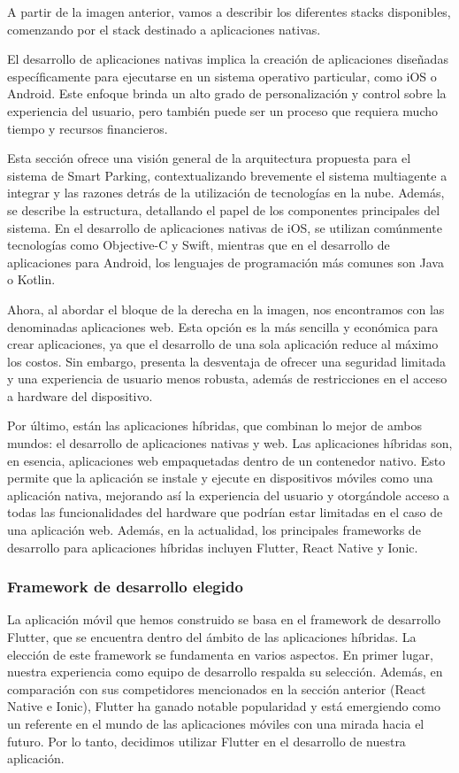 A partir de la imagen anterior, vamos a describir los diferentes stacks disponibles, comenzando por el stack destinado a aplicaciones nativas.

El desarrollo de aplicaciones nativas implica la creación de aplicaciones diseñadas específicamente para ejecutarse en un sistema operativo particular, como iOS o Android. Este enfoque brinda un alto grado de personalización y control sobre la experiencia del usuario, pero también puede ser un proceso que requiera mucho tiempo y recursos financieros.

Esta sección ofrece una visión general de la arquitectura propuesta para el sistema de Smart Parking, contextualizando brevemente el sistema multiagente a integrar y las razones detrás de la utilización de tecnologías en la nube. Además, se describe la estructura, detallando el papel de los componentes principales del sistema. En el desarrollo de aplicaciones nativas de iOS, se utilizan comúnmente tecnologías como Objective-C y Swift, mientras que en el desarrollo de aplicaciones para Android, los lenguajes de programación más comunes son Java o Kotlin.

Ahora, al abordar el bloque de la derecha en la imagen, nos encontramos con las denominadas aplicaciones web. Esta opción es la más sencilla y económica para crear aplicaciones, ya que el desarrollo de una sola aplicación reduce al máximo los costos. Sin embargo, presenta la desventaja de ofrecer una seguridad limitada y una experiencia de usuario menos robusta, además de restricciones en el acceso a hardware del dispositivo.

Por último, están las aplicaciones híbridas, que combinan lo mejor de ambos mundos: el desarrollo de aplicaciones nativas y web. Las aplicaciones híbridas son, en esencia, aplicaciones web empaquetadas dentro de un contenedor nativo. Esto permite que la aplicación se instale y ejecute en dispositivos móviles como una aplicación nativa, mejorando así la experiencia del usuario y otorgándole acceso a todas las funcionalidades del hardware que podrían estar limitadas en el caso de una aplicación web. Además, en la actualidad, los principales frameworks de desarrollo para aplicaciones híbridas incluyen Flutter, React Native y Ionic.


\subsubsection{Framework de desarrollo elegido}
La aplicación móvil que hemos construido se basa en el framework de desarrollo Flutter, que se encuentra dentro del ámbito de las aplicaciones híbridas. La elección de este framework se fundamenta en varios aspectos. En primer lugar, nuestra experiencia como equipo de desarrollo respalda su selección. Además, en comparación con sus competidores mencionados en la sección anterior (React Native e Ionic), Flutter ha ganado notable popularidad y está emergiendo como un referente en el mundo de las aplicaciones móviles con una mirada hacia el futuro. Por lo tanto, decidimos utilizar Flutter en el desarrollo de nuestra aplicación.

